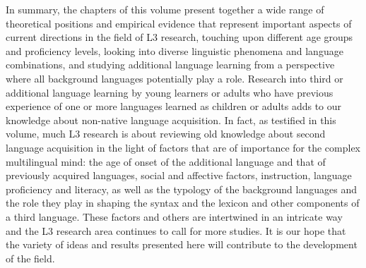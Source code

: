 \documentclass[output=paper,colorlinks,citecolor=brown,nonflat]{langsci/langscibook}
\begin{document}
In summary, the chapters of this volume present together a wide range of theoretical positions and empirical evidence that represent important aspects of current directions in the field of L3 research, touching upon different age groups and proficiency levels, looking into diverse linguistic phenomena and language combinations, and studying additional language learning from a perspective where all background languages potentially play a role. Research into third or additional language learning by young learners or adults who have previous experience of one or more languages learned as children or adults adds to our knowledge about non-native language acquisition. In fact, as testified in this volume, much L3 research is about reviewing old knowledge about second language acquisition in the light of factors that are of importance for the complex multilingual mind: the age of onset of the additional language and that of previously acquired languages, social and affective factors, instruction, language proficiency and literacy, as well as the typology of the background languages and the role they play in shaping the syntax and the lexicon and other components of a third language. These factors and others are intertwined in an intricate way and the L3 research area continues to call for more studies. It is our hope that the variety of ideas and results presented here will contribute to the development of the field.

{\sloppy\printbibliography[heading=subbibliography,notkeyword=this]}
\end{document}
